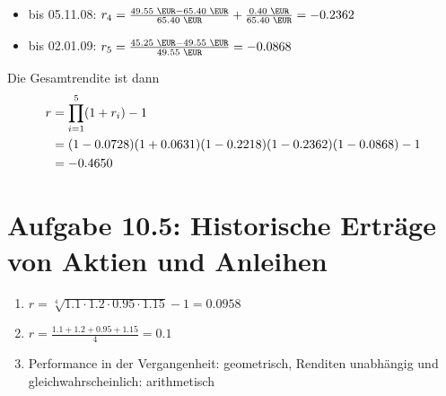 \documentclass{article}
\begin{document}
\begin{enumerate}[label=(\alph*)]
\begin{itemize}
			\item bis 05.11.08: $r_4=\frac{49.55\text{ \EUR} - 65.40\text{ \EUR}}{65.40\text{ \EUR}} + \frac{0.40\text{ \EUR}}{65.40\text{ \EUR}} = -0.2362$
			\item bis 02.01.09: $r_5=\frac{45.25\text{ \EUR} - 49.55\text{ \EUR}}{49.55\text{ \EUR}} = -0.0868$
		\end{itemize}
		Die Gesamtrendite ist dann
		\begin{align}
			r &= \prod_{i=1}^{5} (1+r_i) - 1 \notag \\
			&= (1-0.0728)(1+0.0631)(1-0.2218)(1-0.2362)(1-0.0868) - 1 \notag \\
			&= -0.4650 \notag
		\end{align}
	\end{enumerate}
	
	\section*{Aufgabe 10.5: Historische Erträge von Aktien und Anleihen}
	\begin{enumerate}[label=(\alph*)]
		\item $r=\sqrt[4]{1.1\cdot 1.2\cdot 0.95\cdot 1.15}-1=0.0958$
		\item $r=\frac{1.1+1.2+0.95+1.15}{4}=0.1$
		\item Performance in der Vergangenheit: geometrisch, Renditen unabhängig und gleichwahrscheinlich: arithmetisch
	\end{enumerate}
	
\end{document}
